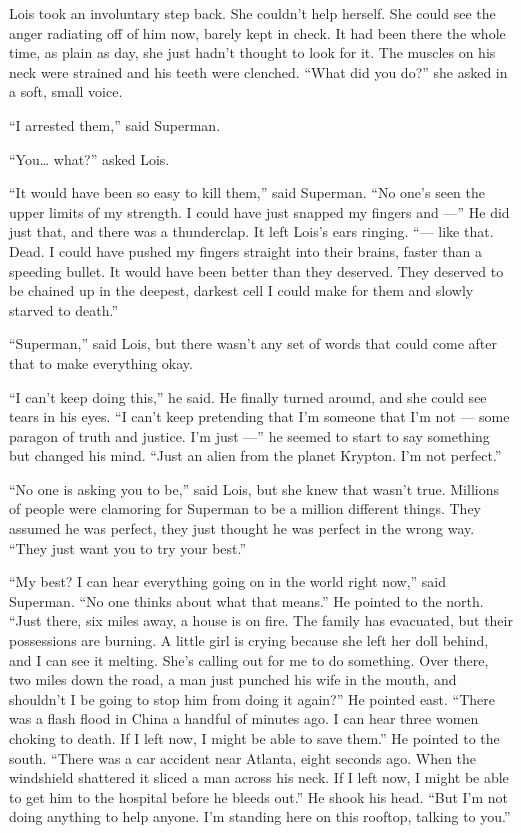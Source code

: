 Lois took an involuntary step back. She couldn't help herself. She could
see the anger radiating off of him now, barely kept in check. It had
been there the whole time, as plain as day, she just hadn't thought to
look for it. The muscles on his neck were strained and his teeth were
clenched. ``What did you do?'' she asked in a soft, small voice.

``I arrested them,'' said Superman.

``You\ldots{} what?'' asked Lois.

``It would have been so easy to kill them,'' said Superman. ``No one's
seen the upper limits of my strength. I could have just snapped my
fingers and ---'' He did just that, and there was a thunderclap. It left
Lois's ears ringing. ``--- like that. Dead. I could have pushed my
fingers straight into their brains, faster than a speeding bullet. It
would have been better than they deserved. They deserved to be chained
up in the deepest, darkest cell I could make for them and slowly starved
to death.''

``Superman,'' said Lois, but there wasn't any set of words that could
come after that to make everything okay.

``I can't keep doing this,'' he said. He finally turned around, and she
could see tears in his eyes. ``I can't keep pretending that I'm someone
that I'm not --- some paragon of truth and justice. I'm just ---'' he
seemed to start to say something but changed his mind. ``Just an alien
from the planet Krypton. I'm not perfect.''

``No one is asking you to be,'' said Lois, but she knew that wasn't
true. Millions of people were clamoring for Superman to be a million
different things. They assumed he was perfect, they just thought he was
perfect in the wrong way. ``They just want you to try your best.''

``My best? I can hear everything going on in the world right now,'' said
Superman. ``No one thinks about what that means.'' He pointed to the
north. ``Just there, six miles away, a house is on fire. The family has
evacuated, but their possessions are burning. A little girl is crying
because she left her doll behind, and I can see it melting. She's
calling out for me to do something. Over there, two miles down the road,
a man just punched his wife in the mouth, and shouldn't I be going to
stop him from doing it again?'' He pointed east. ``There was a flash
flood in China a handful of minutes ago. I can hear three women choking
to death. If I left now, I might be able to save them.'' He pointed to
the south. ``There was a car accident near Atlanta, eight seconds ago.
When the windshield shattered it sliced a man across his neck. If I left
now, I might be able to get him to the hospital before he bleeds out.''
He shook his head. ``But I'm not doing anything to help anyone. I'm
standing here on this rooftop, talking to you.''

